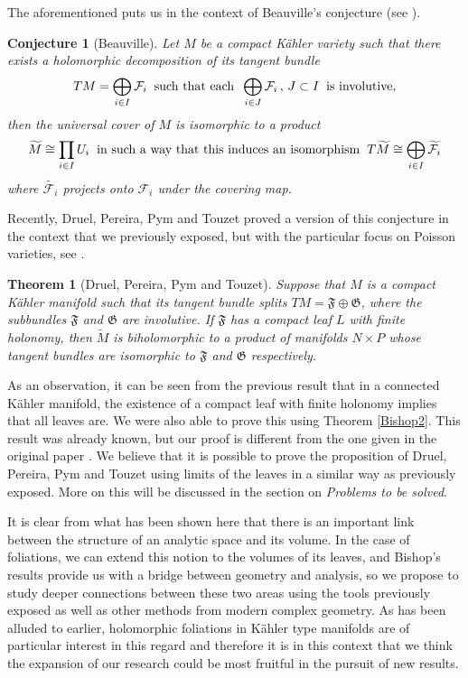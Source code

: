 \documentclass{article}
\newtheorem{theorem}{Theorem}
\newtheorem{conjetura}{Conjecture}
\begin{document}
The aforementioned puts us in the context of Beauville's conjecture (see \cite{Beuville}).
\begin{conjetura}[Beauville]\label{Beauville}
        Let $M$ be a compact Kähler variety such that there exists a holomorphic decomposition of its tangent bundle
        \[
        TM=\bigoplus_{i\in I}\mathcal{F}_i\hspace{0.2cm}\text{such that each}\hspace{0.2cm}\bigoplus_{i\in J}\mathcal{F}_i\,,\,J\subset I\hspace{0.2cm}\text{is involutive},
        \]
        then the universal cover of $M$ is isomorphic to a product
        \[
        \widetilde{M}\cong\prod_{i\in I}U_i\hspace{0.2cm}\text{in such a way that this induces an isomorphism}\hspace{0.2cm}T\widetilde{M}\cong\bigoplus_{i\in I}\widetilde{\mathcal{F}_i}
      \]
      where $\widetilde{\mathcal{F}_{i}}$ projects onto $\mathcal{F}_{i}$ under the covering map.
\end{conjetura}
Recently, Druel, Pereira, Pym and Touzet proved a version of this conjecture in the context that we previously exposed,
but with the particular focus on Poisson varieties, see \cite{DPPT}.
\begin{theorem}[Druel, Pereira, Pym and Touzet]\label{DPPT}
        Suppose that $M$ is a compact Kähler manifold such that its tangent bundle splits $TM=\mathfrak{F}\oplus\mathfrak{G}$, where
        the subbundles $\mathfrak{F}$ and $\mathfrak{G}$ are involutive. If $\mathfrak{F}$ has a compact leaf $L$ with finite holonomy,
        then $\widetilde{M}$ is biholomorphic to a product of manifolds $N\times P$ whose tangent bundles are isomorphic
        to $\mathfrak{F}$ and $\mathfrak{G}$ respectively.
\end{theorem}
\noindent As an observation, it can be seen from the previous result that in a connected Kähler manifold, the existence
of a compact leaf with finite holonomy implies that all leaves are. We were also able to prove this using
Theorem \ref{Bishop2}. This result was already known, but our proof is different from the one given in the
original paper \cite{Pereira}.
We believe that it is possible to prove the proposition of Druel, Pereira, Pym and Touzet using limits of the leaves
in a similar way as previously exposed. More on this will be discussed in the section on \textit{Problems to be solved}.

It is clear from what has been shown here that there is an important link between the structure of an analytic space and its volume.
In the case of foliations, we can extend this notion to the volumes of its leaves, and Bishop's results
provide us with a bridge between geometry and analysis, so we propose to study deeper connections between these
two areas using the tools previously exposed as well as other methods from modern complex geometry.
As has been alluded to earlier, holomorphic foliations in Kähler type manifolds are of particular interest in this regard
and therefore it is in this context that we think the expansion of our research could be most fruitful in the
pursuit of new results.
\end{document}
